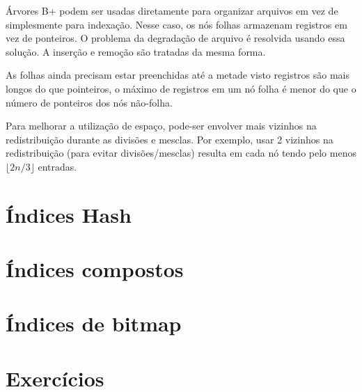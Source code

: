 Árvores B+ podem ser usadas diretamente para organizar arquivos
em vez de simplesmente para indexação. 
Nesse caso, os nós folhas armazenam registros em vez de ponteiros.
O problema da degradação de arquivo é resolvida usando essa solução.
A inserção e remoção são tratadas da mesma forma.

As folhas ainda precisam estar preenchidas até a metade visto
registros são mais longos do que pointeiros, 
o máximo de registros em um nó folha é menor do que o número de ponteiros
dos nós não-folha.

Para melhorar a utilização de espaço, pode-ser envolver mais vizinhos na 
redistribuição durante as divisões e mesclas.
Por exemplo, usar 2 vizinhos na redistribuição (para evitar divisões/mesclas)
resulta em cada nó tendo pelo menos $\lfloor 2n/3 \rfloor$ entradas.

\section{Índices Hash}

\section{Índices compostos}

\section{Índices de bitmap}

\section{Exercícios}

